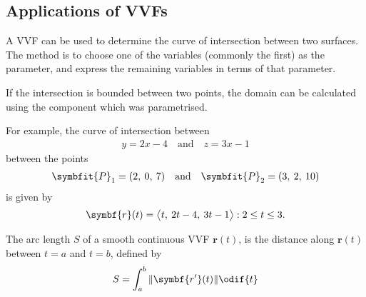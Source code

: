 \documentclass{article}
\begin{document}
\subsection{Applications of VVFs}
\begin{theorem}
    A VVF can be used to determine the curve of intersection between two
    surfaces. The method is to choose one of the variables (commonly the first)
    as the parameter, and express the remaining variables in terms of that parameter.

    If the intersection is bounded between two points, the domain can be
    calculated using the component which was parametrised.

    For example, the curve of intersection between
    \begin{align*}
        y = 2x - 4 \quad \text{and} \quad z = 3x - 1
    \end{align*}
    between the points
    \begin{align*}
        \symbfit{P}_1 = (2,\: 0,\: 7) \quad \text{and} \quad \symbfit{P}_2 = (3,\: 2,\: 10)
    \end{align*}
    is given by
    \begin{equation*}
        \symbf{r}(t) = \avec[\big]{t,\: 2t - 4,\: 3t - 1} : 2 \leq t \leq 3.
    \end{equation*}
\end{theorem}
\begin{definition}
    The arc length \(S\) of a smooth continuous VVF \(\symbf{r}(t)\), is the distance along \(\symbf{r}(t)\)
    between \(t=a\) and \(t=b\), defined by
    \begin{equation*}
        S = \int_a^b \norm{\symbf{r'}(t)} \odif{t}
    \end{equation*}
\end{definition}
\newpage
\end{document}
